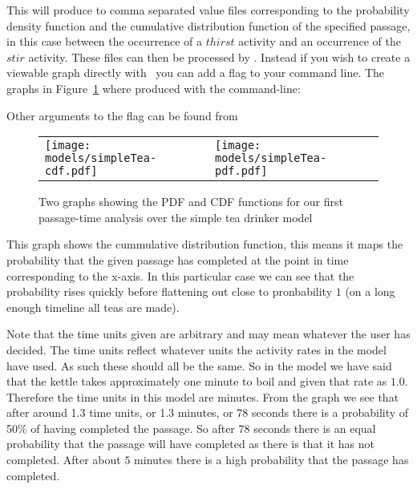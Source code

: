 \documentclass[10pt,a4paper]{article}
\begin{document}

This will produce to comma separated value files corresponding to the
probability density function and the cumulative distribution function
of the specified passage, in this case between the occurrence of a
$thirst$ activity and an occurrence of the $stir$ activity.
These files can then be processed by \gnuplot. Instead if you wish to
create a viewable graph directly with \ipc\ you can add a 
 flag to your command line. The graphs in
Figure~\ref{figure:simpleTea-passage-results-graphs}
where produced with the command-line:


Other arguments to the  flag can be found from



\begin{figure}
\begin{tabular}{ll}
\texttt{[image: models/simpleTea-cdf.pdf]}
&
\texttt{[image: models/simpleTea-pdf.pdf]}
\end{tabular}
\caption{\label{figure:simpleTea-passage-results-graphs}
Two graphs showing the PDF and CDF functions for our first
passage-time analysis over the simple tea drinker model
}
\end{figure}

This graph shows the cummulative distribution function, this means
it maps the probability that the given passage has completed at
the point in time corresponding to the x-axis. In this particular
case we can see that the probability rises quickly before flattening
out close to pronbability $1$ (on a long enough timeline all teas are made).

Note that the time units given are arbitrary and may mean whatever the user
has decided. The time units reflect whatever units the activity rates
in the model have used. As such these should all be the same. So in the model
we have said that the kettle takes approximately one minute to boil and
given that rate as $1.0$. Therefore the time units in this model are minutes.
From the graph we see that after around 1.3 time units, or 1.3 minutes, or
$78$ seconds there is a probability of 50\% of having completed the passage.
So after $78$ seconds there is an equal probability that the passage will
have completed as there is that it has not completed. 
After about $5$ minutes there is a high probability
that the passage has completed.
\end{document}
